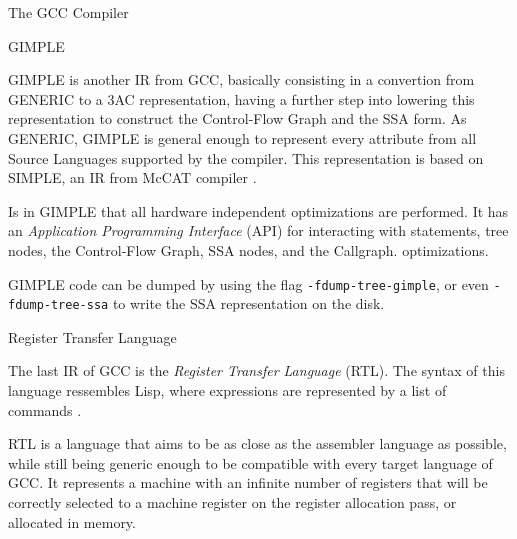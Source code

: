 \begin{section}{The GCC Compiler}
\begin{subsection}{GIMPLE}

GIMPLE is another IR from GCC, basically consisting in a convertion from
GENERIC to a 3AC representation, having a further step into lowering this
representation to construct the Control-Flow Graph and the SSA form. As
GENERIC, GIMPLE is general enough to represent
every attribute from all Source Languages supported by the compiler. This
representation is based on SIMPLE, an IR from McCAT compiler \citep{gimple}.


	Is in GIMPLE that all hardware independent optimizations are performed. It
has an \textit{Application Programming Interface} (API) for interacting with
statements, tree nodes, the Control-Flow Graph, SSA nodes, and the Callgraph.
optimizations.

	GIMPLE code can be dumped by using the flag \texttt{-fdump-tree-gimple},
	or even \texttt{-fdump-tree-ssa} to write the SSA representation on the
	disk.

\end{subsection}

\begin{subsection}{Register Transfer Language}

	The last IR of GCC is the \textit{Register Transfer Language} (RTL).
	The syntax of this language ressembles Lisp, where expressions
	are represented by a list of commands \citep{rtl}.



	RTL is a language that aims to be as close as the assembler language
	as possible, while still being generic enough to be compatible with
	every target language of GCC. It represents a machine with an infinite
	number of registers that will be correctly selected to a machine
	register on the register allocation pass, or allocated in memory.


\end{subsection}
\end{section}
